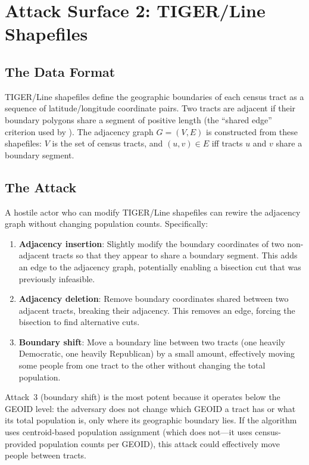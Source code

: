 \section{Attack Surface 2: TIGER/Line Shapefiles}
\label{sec:tiger}

\subsection{The Data Format}

TIGER/Line shapefiles define the geographic boundaries of each census tract
as a sequence of latitude/longitude coordinate pairs.
Two tracts are adjacent if their boundary polygons share a segment of
positive length (the ``shared edge'' criterion used by \bisect{}).
The adjacency graph $G = (V, E)$ is constructed from these shapefiles:
$V$ is the set of census tracts, and $(u, v) \in E$ iff tracts $u$ and $v$
share a boundary segment.

\subsection{The Attack}

A hostile actor who can modify TIGER/Line shapefiles can rewire the
adjacency graph without changing population counts.
Specifically:
\begin{enumerate}
\item \textbf{Adjacency insertion}: Slightly modify the boundary
  coordinates of two non-adjacent tracts so that they appear to share
  a boundary segment.
  This adds an edge to the adjacency graph, potentially enabling
  a bisection cut that was previously infeasible.
\item \textbf{Adjacency deletion}: Remove boundary coordinates shared
  between two adjacent tracts, breaking their adjacency.
  This removes an edge, forcing the bisection to find alternative cuts.
\item \textbf{Boundary shift}: Move a boundary line between two tracts
  (one heavily Democratic, one heavily Republican) by a small amount,
  effectively moving some people from one tract to the other
  without changing the total population.
\end{enumerate}

Attack~3 (boundary shift) is the most potent because it operates below
the GEOID level: the adversary does not change which GEOID a tract has or
what its total population is, only where its geographic boundary lies.
If the algorithm uses centroid-based population assignment (which
\bisect{} does not---it uses census-provided population counts per GEOID),
this attack could effectively move people between tracts.

